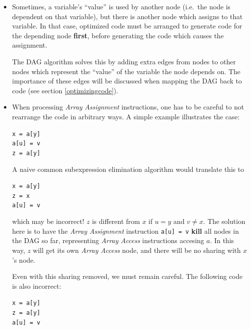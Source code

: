 \documentclass[a4paper]{article}
\begin{document}
\begin{itemize}
\item Sometimes, a variable's ``value'' is used by another node (i.e.~the node
is dependent on that variable), but there is another node which assigns to
that variable. In that case, optimized code must be arranged to generate code
for the depending node \textbf{first}, before generating the code which causes
the assignment.

The DAG algorithm solves this by adding extra edges from nodes to other
nodes which represent the ``value'' of the variable the node depends on.
The importance of these edges will be discussed when mapping the DAG back to
code (see section \ref{optimizingcode}).

\item When processing \textsl{Array Assignment} instructions, one has to be
careful to not rearrange the code in arbitrary ways. A simple example
illustrates the case:\\
\begin{center}
\texttt{x = a[y]}\\
\texttt{a[u] = v}\\
\texttt{z = a[y]}\\
\end{center}

A naive common subexpression elimination algorithm would translate this to\\
\begin{center}
\texttt{x = a[y]}\\
\texttt{z = x}\\
\texttt{a[u] = v}\\
\end{center}

which may be incorrect! $z$ is different from $x$ if $u = y$ and $v \neq x$.
The solution here is to have the \textsl{Array Assignment} instruction
\texttt{a[u] = v} \textbf{kill} all nodes in the DAG so far, representing
\textsl{Array Access} instructions accesing $a$.
In this way, $z$ will get its own \textsl{Array Access} node,
and there will be no sharing with $x$'s node.

Even with this sharing removed, we must remain careful. The following code is
also incorrect:\\
\begin{center}
\texttt{x = a[y]}\\
\texttt{z = a[y]}\\
\texttt{a[u] = v}\\
\end{center}


\end{itemize}
\end{document}
